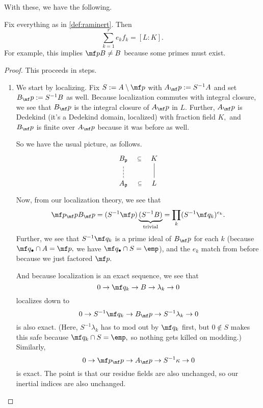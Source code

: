 With these, we have the following.
\begin{proposition}
	Fix everything as in \autoref{def:raminert}. Then
	\[\sum_{k=1}^re_kf_k=[L:K].\]
	For example, this implies $\mf pB\ne B$ because some primes must exist.
\end{proposition}
\begin{proof}
	This proceeds in steps.
	\begin{enumerate}
		\item We start by localizing. Fix $S:=A\setminus\mf p$ with $A_\mf p:=S^{-1}A$ and set $B_\mf p:=S^{-1}B$ as well. Because localization commutes with integral closure, we see that $B_\mf p$ is the integral closure of $A_\mf p$ in $L.$ Further, $A_\mf p$ is Dedekind (it's a Dedekind domain, localized) with fraction field $K,$ and $B_\mf p$ is finite over $A_\mf p$ because it was before as well.\todo{}

		So we have the usual picture, as follows.
		\[\begin{tikzcd}
			{B_\mathfrak p} & K \\
			{A_{\mathfrak p}} & L
			\arrow[no head, from=2-2, to=1-2]
			\arrow[dashed, no head, from=2-1, to=1-1]
			\arrow["\subseteq"{description}, draw=none, from=2-1, to=2-2]
			\arrow["\subseteq"{description}, draw=none, from=1-1, to=1-2]
		\end{tikzcd}\]
		Now, from our localization theory, we see that
		\[\mf p_\mf pB_\mf p=(S^{-1}\mf p)\underbrace{(S^{-1}B)}_{\text{trivial}}=\prod_k(S^{-1}\mf q_k)^{e_k}.\]
		Further, we see that $S^{-1}\mf q_k$ is a prime ideal of $B_\mf p$ for each $k$ (because $\mf q_\bullet\cap A=\mf p,$ we have $\mf q_\bullet\cap S=\emp$), and the $e_k$ match from before because we just factored $\mf p.$

		And because localization is an exact sequence, we see that
		\[0\to\mf q_k\to B\to\lambda_k\to0\]
		localizes down to
		\[0\to S^{-1}\mf q_k\to B_\mf p\to S^{-1}\lambda_k\to0\]
		is also exact. (Here, $S^{-1}\lambda_k$ has to mod out by $\mf q_k$ first, but $0\notin S$ makes this safe because $\mf q_k\cap S=\emp,$ so nothing gets killed on modding.) Similarly,
		\[0\to\mf p_\mf p\to A_\mf p\to S^{-1}\kappa\to0\]
		is exact. The point is that our residue fields are also unchanged\todo{}, so our inertial indices are also unchanged.


\end{enumerate}
\end{proof}
